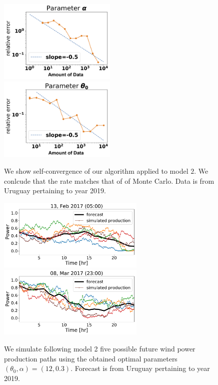 \documentclass[11pt]{article}
\begin{document}
\begin{figure}
  \includegraphics[width=56mm,scale=1]{plots/alpha_conv_beta.png}
  \includegraphics[width=56mm,scale=1]{plots/theta_conv_beta.png}
  \caption{We show self-convergence of our algorithm applied to model $2$. We conlcude that the rate  matches that of of Monte Carlo. Data is from Uruguay pertaining to year 2019.}
\end{figure}

    \begin{figure}[h]
      \includegraphics[width=70mm,scale=1]{simulated/24hr/1099.pdf}
      \includegraphics[width=70mm,scale=1]{simulated/24hr/1178.pdf}
      \caption{We simulate following model 2  five possible future wind power production paths using the obtained optimal parameters $(\theta_0, \alpha )=(12,0.3)$. Forecast is from Uruguay pertaining to  year 2019.}
    \end{figure}
\end{document}
